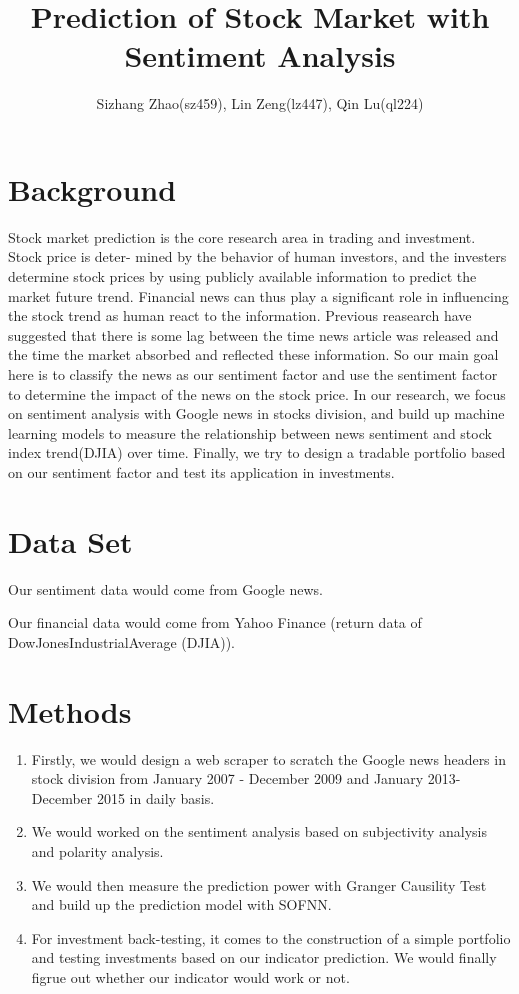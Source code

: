\documentclass[11pt,a4paper]{article}
\numberwithin{equation}{section}
\begin{document}
\title{Prediction of Stock Market with Sentiment Analysis}
\author{Sizhang Zhao(sz459), Lin Zeng(lz447), Qin Lu(ql224)}
\maketitle

\section{Background}
Stock market prediction is the core research area in trading and investment. Stock price is deter- mined by the behavior of human investors, and the investers determine stock prices by using publicly available information to predict the market future trend. Financial news can thus play a significant role in influencing the stock trend as human react to the information. Previous reasearch have suggested that there is some lag between the time news article was released and the time the market absorbed and reflected these information. So our main goal here is to classify the news as our sentiment factor and use the sentiment factor to determine the impact of the news on the stock price.
In our research, we focus on sentiment analysis with Google news in stocks division, and build up machine learning models to measure the relationship between news sentiment and stock index trend(DJIA) over time. Finally, we try to design a tradable portfolio based on our sentiment factor and test its application in investments.

\section{Data Set}
Our sentiment data would come from Google news.

Our financial data would come from Yahoo Finance (return data of DowJonesIndustrialAverage (DJIA)).

\section{Methods}
\begin{enumerate}
\item
Firstly, we would design a web scraper to scratch the Google news headers in stock division from January 2007 - December 2009 and January 2013- December 2015 in daily basis.
\item
We would worked on the sentiment analysis based on subjectivity analysis and polarity analysis.
\item
We would then measure the prediction power with Granger Causility Test and build up the prediction model with SOFNN.
\item
For investment back-testing, it comes to the construction of a simple portfolio and testing investments based on our indicator prediction. We would finally figrue out whether our indicator would work or not.
\end{enumerate}
\end{document}
